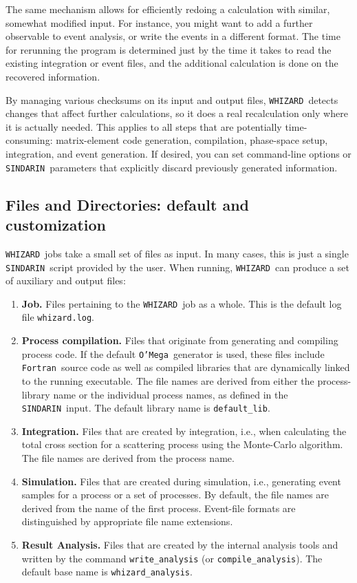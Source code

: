 \documentclass[12pt]{book}
\newcommand{\ttt}[1]{\texttt{#1}}
\newcommand{\whizard}{\ttt{WHIZARD}}
\newcommand{\oMega}{\ttt{O'Mega}}
\newcommand{\sindarin}{\ttt{SINDARIN}}
\newcommand{\fortran}{\ttt{Fortran}}
\begin{document}
The same mechanism allows for efficiently redoing a calculation with
similar, somewhat modified input.  For instance, you might want to add
a further observable to event analysis, or write the events in a
different format.  The time for rerunning the program is determined
just by the time it takes to read the existing integration or event
files, and the additional calculation is done on the recovered
information.

By managing various checksums on its input and output files, \whizard\
detects changes that affect further calculations, so it does a
real recalculation only where it is actually needed.  This applies to
all steps that are potentially time-consuming: matrix-element code
generation, compilation, phase-space setup, integration, and event
generation.  If desired, you can set command-line options or
\sindarin\ parameters that explicitly discard previously generated
information.


\subsection{Files and Directories: default and customization}

\whizard\ jobs take a small set of files as input.  In many cases, this is
just a single \sindarin\ script provided by the user.
When running, \whizard\ can produce a set of auxiliary and output files:
\begin{enumerate}
\item
  \textbf{Job.}
  Files pertaining to the \whizard\ job as a whole.  This is the default log
  file \ttt{whizard.log}.
\item
  \textbf{Process compilation.}  Files that originate from generating and
  compiling process code.  If the default \oMega\ generator is used, these
  files include \fortran\ source code as well as compiled libraries that are
  dynamically linked to the running executable.  The file names are derived
  from either the process-library name or the individual process names, as
  defined in the \sindarin\ input.  The default library name is
  \ttt{default\_lib}.
\item
  \textbf{Integration.}
  Files that are created by integration, i.e., when calculating the total cross
  section for a scattering process using the Monte-Carlo algorithm.  The file
  names are derived from the process name.
\item
  \textbf{Simulation.}
  Files that are created during simulation, i.e., generating event samples for
  a process or a set of processes.  By default, the file names are derived
  from the name of the first process.  Event-file formats are distinguished
  by appropriate file name extensions.
\item
  \textbf{Result Analysis.}
  Files that are created by the internal analysis tools and written by the
  command \ttt{write\_analysis} (or \ttt{compile\_analysis}).  The default
  base name is \ttt{whizard\_analysis}.
\end{enumerate}
\end{document}

